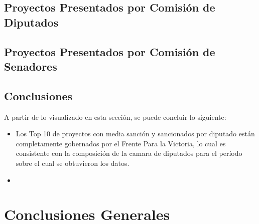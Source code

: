 \documentclass[12pt,a4paper,titlepage]{article}
\begin{document}
  \subsection{Proyectos Presentados por Comisión de Diputados}
  
  \subsection{Proyectos Presentados por Comisión de Senadores}
  
  \subsection{Conclusiones}
    A partir de lo visualizado en esta sección, se puede concluir lo siguiente:
    
    \begin{itemize}
    	\item Los Top 10 de proyectos con media sanción y sancionados por diputado están completamente gobernados por el Frente Para la Victoria, lo cual es consistente con la composición de la camara de diputados para el período sobre el cual se obtuvieron los datos.
    	
    	\item
    \end{itemize}
  

  \section{Conclusiones Generales}\label{section:conclusions}
  
\end{document}
